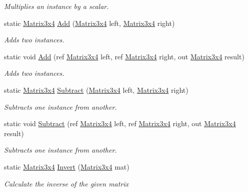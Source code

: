 \begin{DoxyCompactItemize}
\begin{DoxyCompactList}\small\item\em Multiplies an instance by a scalar. \end{DoxyCompactList}\item 
static \hyperlink{struct_open_t_k_1_1_matrix3x4}{Matrix3x4} \hyperlink{struct_open_t_k_1_1_matrix3x4_a343f6e684ab65ecf3b9627d2136f4a43}{Add} (\hyperlink{struct_open_t_k_1_1_matrix3x4}{Matrix3x4} left, \hyperlink{struct_open_t_k_1_1_matrix3x4}{Matrix3x4} right)
\begin{DoxyCompactList}\small\item\em Adds two instances. \end{DoxyCompactList}\item 
static void \hyperlink{struct_open_t_k_1_1_matrix3x4_aed4094f349dcea03ad07b9151049b132}{Add} (ref \hyperlink{struct_open_t_k_1_1_matrix3x4}{Matrix3x4} left, ref \hyperlink{struct_open_t_k_1_1_matrix3x4}{Matrix3x4} right, out \hyperlink{struct_open_t_k_1_1_matrix3x4}{Matrix3x4} result)
\begin{DoxyCompactList}\small\item\em Adds two instances. \end{DoxyCompactList}\item 
static \hyperlink{struct_open_t_k_1_1_matrix3x4}{Matrix3x4} \hyperlink{struct_open_t_k_1_1_matrix3x4_a233c0ff733197ddf266d480c8cbdf758}{Subtract} (\hyperlink{struct_open_t_k_1_1_matrix3x4}{Matrix3x4} left, \hyperlink{struct_open_t_k_1_1_matrix3x4}{Matrix3x4} right)
\begin{DoxyCompactList}\small\item\em Subtracts one instance from another. \end{DoxyCompactList}\item 
static void \hyperlink{struct_open_t_k_1_1_matrix3x4_a3620aa2fb3f3176778ea8df494afe52b}{Subtract} (ref \hyperlink{struct_open_t_k_1_1_matrix3x4}{Matrix3x4} left, ref \hyperlink{struct_open_t_k_1_1_matrix3x4}{Matrix3x4} right, out \hyperlink{struct_open_t_k_1_1_matrix3x4}{Matrix3x4} result)
\begin{DoxyCompactList}\small\item\em Subtracts one instance from another. \end{DoxyCompactList}\item 
static \hyperlink{struct_open_t_k_1_1_matrix3x4}{Matrix3x4} \hyperlink{struct_open_t_k_1_1_matrix3x4_ab32d6d048a6df4cd6dbd3d927d681306}{Invert} (\hyperlink{struct_open_t_k_1_1_matrix3x4}{Matrix3x4} mat)
\begin{DoxyCompactList}\small\item\em Calculate the inverse of the given matrix \end{DoxyCompactList}\item 

\end{DoxyCompactItemize}
